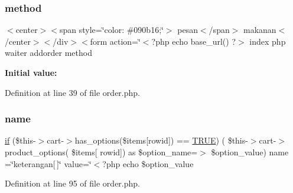 \subsubsection{\texorpdfstring{method}{method}}
{\footnotesize\ttfamily $<$center$>$$<$span style=\char`\"{}color\+: \#090b16;\char`\"{}$>$ pesan$<$/span$>$ makanan$<$/center$>$$<$/div$>$$<$form action=\char`\"{}$<$?php echo base\+\_\+url() ?$>$ index php waiter addorder method}

{\bfseries Initial value\+:}
\begin{DoxyCode}{0}
\DoxyCodeLine{=\textcolor{stringliteral}{"post"}>}

\end{DoxyCode}


Definition at line 39 of file order.\+php.

\mbox{\label{waiter_2order_8php_afb270cde4944e425a37cf277116a7f43}} 
\subsubsection{\texorpdfstring{name}{name}}
{\footnotesize\ttfamily \mbox{\hyperlink{_code_igniter_8php_a68ca62d45495d195f67d234bdafb1d1f}{if}} (\$this-\/$>$cart-\/$>$has\+\_\+options(\$items\mbox{[}\textquotesingle{}rowid\textquotesingle{}\mbox{]}) == \mbox{\hyperlink{constants_8php_ae04a3efe6aa42044f803ee90c2277846}{T\+R\+UE}}) ( \$this-\/$>$cart-\/$>$product\+\_\+options( \$items\mbox{[} \textquotesingle{}rowid\textquotesingle{}\mbox{]}) as \$option\+\_\+name=$>$ \$option\+\_\+value) name =\char`\"{}keterangan\mbox{[}$\,$\mbox{]}\char`\"{} value=\char`\"{}$<$?php echo \$option\+\_\+value}



Definition at line 95 of file order.\+php.

